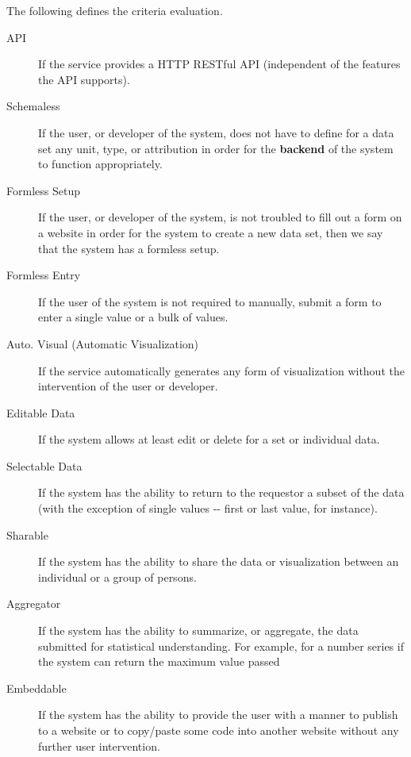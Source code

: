 \documentclass[10pt,a4paper,english]{article}
\begin{document}
The following defines the criteria evaluation.
\begin{description}
\item[{API}] \leavevmode 
If the service provides a HTTP RESTful API (independent of the features the API supports).

\item[{Schemaless}] \leavevmode 
If the user, or developer of the system, does not have to define for a data set any unit, type, or attribution in order for the \textbf{backend} of the system to function appropriately.

\item[{Formless Setup}] \leavevmode 
If the user, or developer of the system, is not troubled to fill out a form on a website in order for the system to create a new data set, then we say that the system has a formless setup.

\item[{Formless Entry}] \leavevmode 
If the user of the system is not required to manually, submit a form to enter a single value or a bulk of values.

\item[{Auto. Visual (Automatic Visualization)}] \leavevmode 
If the service automatically generates any form of visualization without the intervention of the user or developer.

\item[{Editable Data}] \leavevmode 
If the system allows at least edit or delete for a set or individual data.

\item[{Selectable Data}] \leavevmode 
If the system has the ability to return to the requestor a subset of the data (with the exception of single values -{}- first or last value, for instance).

\item[{Sharable}] \leavevmode 
If the system has the ability to share the data or visualization between an individual or a group of persons.

\item[{Aggregator}] \leavevmode 
If the system has the ability to summarize, or aggregate, the data submitted for statistical understanding. For example, for a number series if the system can return the maximum value passed

\item[{Embeddable}] \leavevmode 
If the system has the ability to provide the user with a manner to publish to a website or to copy/paste some code into another website without any further user intervention.

\end{description}
\end{document}
